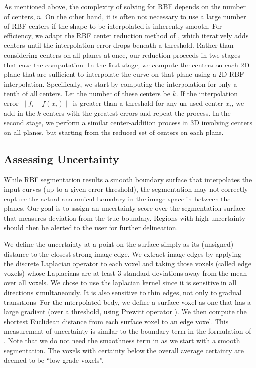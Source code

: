 As mentioned above, the complexity of solving for RBF depends on the number of centers, $n$. On the other hand, it is often not necessary to use a large number of RBF centers if the shape to be interpolated is inherently smooth. For efficiency, we adapt the RBF center reduction method of \cite{carr2001}, which iteratively adds centers until the interpolation error drops beneath a threshold. Rather than considering centers on all planes at once, our reduction proceeds in two stages that ease the computation. In the first stage, we compute the centers on each 2D plane that are sufficient to interpolate the curve on that plane using a 2D RBF interpolation. Specifically, we start by computing the interpolation for only a tenth of all centers. Let the number of these centers be $k$. If the interpolation error $\|f_i-f(x_i)\|$ is greater than a threshold for any un-used center $x_i$, we add in the $k$ centers with the greatest errors and repeat the process. In the second stage, we perform a similar center-addition process in 3D involving centers on all planes, but starting from the reduced set of centers on each plane.

\subsection{Assessing Uncertainty}
While RBF segmentation results a smooth boundary surface that interpolates the input curves (up to a given error threshold), the segmentation may not correctly capture the actual anatomical boundary in the image space in-between the planes. Our goal is to assign an uncertainty score over the segmentation surface that measures deviation from the true boundary. Regions with high uncertainty should then be alerted to the user for further delineation.

We define the uncertainty at a point on the surface simply as its (unsigned) distance to the closest strong image edge. We extract image edges by applying the discrete Laplacian operator to each voxel and taking those voxels (called edge voxels) whose Laplacians are at least 3 standard deviations away from the mean over all voxels. 
We chose to use the laplacian kernel since it is sensitive in all directions simultaneously. It is also sensitive to thin edges, not only to gradual transitions.
For the interpolated body, we define a surface voxel as one that has a large gradient (over a threshold, using Prewitt operator \cite{prewitt1970object}). We then compute the shortest Euclidean distance from each surface voxel to an edge voxel. This measurement of uncertainty is similar to the boundary term in the formulation of \cite{Top2011}. Note that we do not need the smoothness term in \cite{Top2011} as we start with a smooth segmentation.
The voxels with certainty below the overall average certainty are deemed to be ``low grade voxels''.

